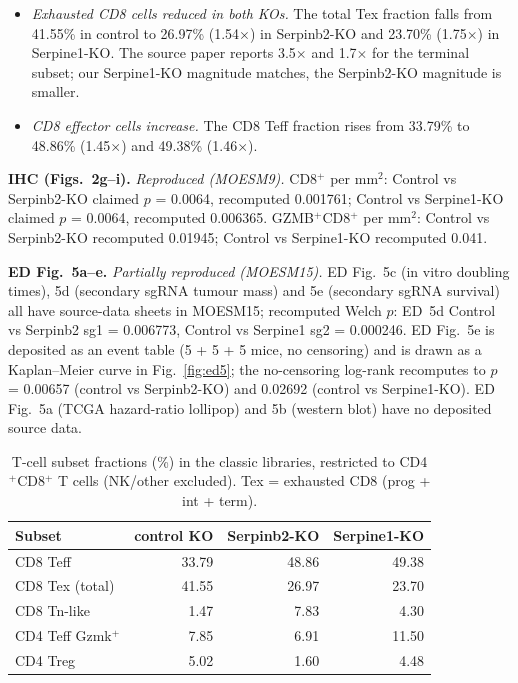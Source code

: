 \documentclass[preprint,12pt]{elsarticle}
\begin{document}
\begin{itemize}
\item \emph{Exhausted CD8 cells reduced in both KOs.} The total Tex
  fraction falls from 41.55\% in control to 26.97\% (1.54$\times$)
  in Serpinb2-KO and 23.70\% (1.75$\times$) in Serpine1-KO. The
  source paper reports 3.5$\times$ and 1.7$\times$ for the terminal
  subset; our Serpine1-KO magnitude matches, the Serpinb2-KO
  magnitude is smaller.
\item \emph{CD8 effector cells increase.} The CD8 Teff fraction
  rises from 33.79\% to 48.86\% (1.45$\times$) and 49.38\%
  (1.46$\times$).
\end{itemize}

\textbf{IHC (Figs.~2g--i).} \emph{Reproduced (MOESM9).}
CD8$^{+}$ per mm$^{2}$: Control vs Serpinb2-KO claimed $p$ = 0.0064,
recomputed 0.001761; Control vs Serpine1-KO claimed $p$ = 0.0064,
recomputed 0.006365. GZMB$^{+}$CD8$^{+}$ per mm$^{2}$: Control vs
Serpinb2-KO recomputed 0.01945; Control vs Serpine1-KO recomputed
0.041.

\textbf{ED Fig.~5a--e.} \emph{Partially reproduced (MOESM15).}
ED Fig.~5c (in vitro doubling times), 5d (secondary sgRNA tumour
mass) and 5e (secondary sgRNA survival) all have source-data sheets
in MOESM15; recomputed Welch $p$: ED~5d Control vs Serpinb2 sg1 =
0.006773, Control vs Serpine1 sg2 = 0.000246. ED Fig.~5e is
deposited as an event table (5 + 5 + 5 mice, no censoring) and is
drawn as a Kaplan--Meier curve in Fig.~\ref{fig:ed5}; the
no-censoring log-rank recomputes to $p$ = 0.00657 (control vs
Serpinb2-KO) and 0.02692 (control vs Serpine1-KO). ED Fig.~5a (TCGA
hazard-ratio lollipop) and 5b (western blot) have no deposited
source data.

\begin{table}[t]
\centering
\footnotesize
\caption{T-cell subset fractions (\%) in the classic libraries,
restricted to CD4$^{+}$CD8$^{+}$ T cells (NK/other excluded).
Tex = exhausted CD8 (prog + int + term).}
\label{tab:tnk}
\begin{tabular}{lrrr}
\toprule
Subset & control KO & Serpinb2-KO & Serpine1-KO \\
\midrule
CD8 Teff          & 33.79 & 48.86 & 49.38 \\
CD8 Tex (total)   & 41.55 & 26.97 & 23.70 \\
CD8 Tn-like       & 1.47 & 7.83 & 4.30 \\
CD4 Teff Gzmk$^{+}$ & 7.85 & 6.91 & 11.50 \\
CD4 Treg          & 5.02 & 1.60 & 4.48 \\
\bottomrule
\end{tabular}
\end{table}
\end{document}
